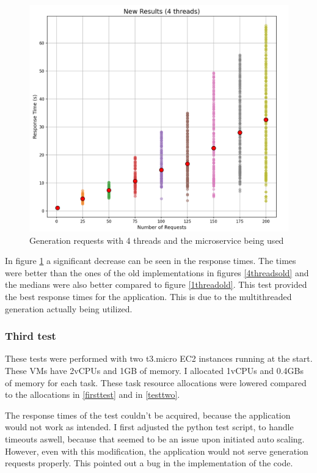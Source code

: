			\begin{figure}[h]
				\begin{center}
					\includegraphics[scale=0.6]{include/imgs/4threads_new.PNG}
					\caption{Generation requests with 4 threads and the microservice being used}
					\label{4threadsnew}
				\end{center}
			\end{figure}

			In figure \ref{4threadsnew} a significant decrease can be seen in the response times. 
			The times were better than the ones of the old implementations in figures 
			\ref{4threadsold} and the medians were also better compared to figure \ref{1threadold}.
			This test provided the best response times for the application.
			This is due to the multithreaded generation actually being utilized.


		\subsubsection{Third test}
			These tests were performed with two t3.micro EC2 instances running at the start. 
			These VMs have 2vCPUs and 1GB of memory. I allocated
			1vCPUs and 0.4GBs of memory for each task. 
			These task resource allocations were lowered compared to the allocations in \ref{firsttest} and in \ref{testtwo}.

			The response times of the test couldn't be acquired, because the application would not work as intended. 
			I first adjusted the python test script, to handle timeouts aswell, because that seemed to be an issue upon initiated 
			auto scaling. However, even with this modification, the application would not serve generation requests properly.
			This pointed out a bug in the implementation of the code.

